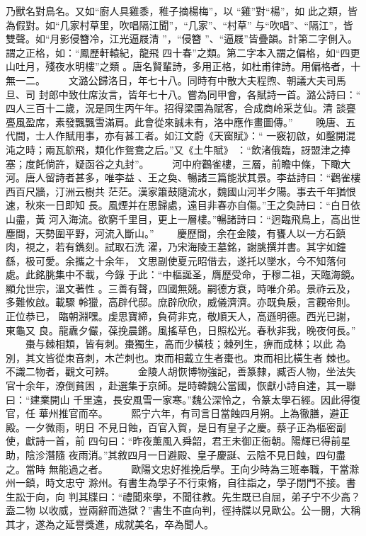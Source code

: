 \documentclass{ctexart}
\begin{document}
乃獸名對鳥名。又如``廚人具雞黍，稚子摘楊梅''，以 ``雞''對``楊''，如 此之類，皆為假對。如``几家村草里，吹唱隔江聞''，``几家''、``村草'' 与``吹唱''、``隔江''，皆雙聲。如``月影侵簪冷，江光逼屐清 ''，``侵簪 ''、``逼屐''皆疊韻。計第二字側入。謂之正格，如：``鳳歷軒轅紀，龍飛 四十春''之類。第二字本入謂之偏格，如``四更山吐月，殘夜水明樓''之類 。唐名賢輩詩，多用正格，如杜甫律詩。用偏格者，十無一二。 　　文潞公歸洛日，年七十八。同時有中散大夫程煦、朝議大夫司馬旦、司 封郎中致仕席汝言，皆年七十八。嘗為同甲會，各賦詩一首。潞公詩曰：`` 四人三百十二歲，況是同生丙午年。招得梁園為賦客，合成商岭采芝仙。清 談亹亹風盈席，素發飄飄雪滿肩。此會從來誠未有，洛中應作畫圖傳。'' 　　晚唐、五代間，士人作賦用事，亦有甚工者。如江文蔚《天窗賦》：`` 一竅初啟，如鑿開混沌之時；兩瓦鴥飛，類化作鴛鴦之后。''又《土牛賦》 ：``飲渚俄臨，訝盟津之捧塞；度飥倘許，疑函谷之丸封''。 　　河中府鸛雀樓，三層，前瞻中條，下瞰大河。唐人留詩者甚多，唯李益 、王之奐、暢諸三篇能狀其景。李益詩曰：``鸛雀樓西百尺牆，汀洲云樹共 茫茫。漢家簫鼓隨流水，魏國山河半夕陽。事去千年猶恨速，秋來一日即知 長。風煙并在思歸處，遠目非春亦自傷。''王之奐詩曰：``白日依山盡，黃 河入海流。欲窮千里目，更上一層樓。''暢諸詩曰：``迥臨飛鳥上，高出世 塵間，天勢圍平野，河流入斷山。'' 　　慶歷間，余在金陵，有饔人以一方石鎮肉，視之，若有鐫刻。試取石洗 濯，乃宋海陵王墓銘，謝朓撰并書。其字如鐘繇，极可愛。余攜之十余年， 文思副使夏元昭借去，遂托以墜水，今不知落何處。此銘朓集中不載，今錄 于此：``中樞誕圣，膺歷受命，于穆二祖，天臨海鏡。顯允世宗，溫文著性 。三善有聲，四國無競。嗣德方衰，時唯介弟。景祚云及，多難攸啟。載驟 軨獵，高辟代邸。庶辟欣欣，威儀濟濟。亦既負扆，言觀帝則。正位恭已， 臨朝淵嘿。虔思寶締，負荷非克，敬順天人，高遜明德。西光已謝，東龜又 良。龍纛夕儼，葆挽晨鏘。風搖草色，日照松光。春秋非我，晚夜何長。'' 　　棗与棘相類，皆有刺。棗獨生，高而少橫枝；棘列生，痹而成林；以此 為別，其文皆從朿音刺，木芒刺也。朿而相戴立生者棗也。朿而相比橫生者 棘也。不識二物者，觀文可辨。 　　金陵人胡恢博物強記，善篆隸，臧否人物，坐法失官十余年，潦倒貧困 ，赴選集于京師。是時韓魏公當國，恢獻小詩自達，其一聯曰：``建業開山 千里遠，長安風雪一家寒。''魏公深怜之，令篆太學石經。因此得復官，任 華州推官而卒。 　　熙宁六年，有司言日當蝕四月朔。上為徹膳，避正殿。一夕微雨，明日 不見日蝕，百官入賀，是日有皇子之慶。蔡子正為樞密副使，獻詩一首，前 四句曰：``昨夜薰風入舜韶，君王未御正衙朝。陽輝已得前星助，陰沴潛隨 夜雨消。''其敘四月一日避殿、皇子慶誕、云陰不見日蝕，四句盡之。當時 無能過之者。 　　歐陽文忠好推挽后學。王向少時為三班奉職，干當滁州一鎮，時文忠守 滁州。有書生為學子不行束脩，自往詣之，學子閉門不接。書生訟于向，向 判其牒曰：``禮聞來學，不聞往教。先生既已自屈，弟子宁不少高？盍二物 以收威，豈兩辭而造獄？''書生不直向判，徑持牒以見歐公。公一閱，大稱 其才，遂為之延譽獎進，成就美名，卒為聞人。
\end{document}
